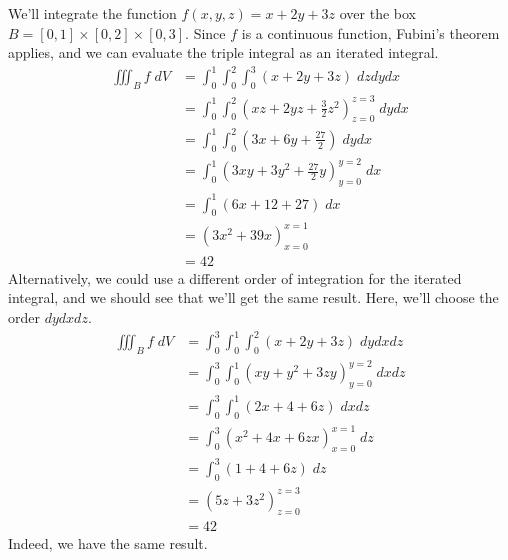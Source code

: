 \documentclass{ximera}
\begin{document}
\begin{example}
We'll integrate the function $f(x,y,z) = x+2y+3z$ over the box $B = [0,1]\times [0,2]\times[0,3]$. Since $f$ is a continuous function, Fubini's theorem applies, and we can evaluate the triple integral as an iterated integral.
\begin{align*}
\iiint_B f\;dV &= \int_0^1\int_0^2\int_0^3 (x+2y+3z)\;dzdydx\\
&= \int_0^1\int_0^2 \left(xz+2yz + \frac{3}{2}z^2\right)_{z=0}^{z=3}\;dydx\\
&= \int_0^1\int_0^2 \left(3x+6y+\frac{27}{2}\right)\;dydx\\
&= \int_0^1 \left(3xy+3y^2+\frac{27}{2}y\right)_{y=0}^{y=2}\;dx\\
&= \int_0^1\left(6x+12+27\right)\;dx\\
&= \left(3x^2+39x\right)_{x=0}^{x=1}\\
&= 42
\end{align*}
Alternatively, we could use a different order of integration for the iterated integral, and we should see that we'll get the same result. Here, we'll choose the order $dydxdz$.
\begin{align*}
\iiint_B f\;dV &= \int_0^3\int_0^1\int_0^2 (x+2y+3z)\;dydxdz\\
&= \int_0^3\int_0^1 (xy+y^2+3zy)_{y=0}^{y=2}\;dxdz\\
&= \int_0^3\int_0^1 (2x+4+6z)\;dxdz\\
&= \int_0^3 (x^2+4x+6zx)_{x=0}^{x=1}\;dz\\
&= \int_0^3 (1+4+6z)\;dz\\
&= (5z+3z^2)_{z=0}^{z=3}\\
&= 42
\end{align*}
Indeed, we have the same result.
\end{example}
\end{document}
